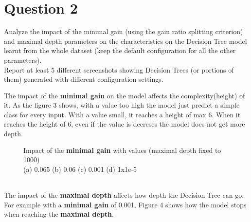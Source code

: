 \section{Question 2}

\begin{question}
    Analyze the impact of the minimal gain (using the gain ratio splitting criterion) and maximal depth
    parameters on the characteristics on the Decision Tree model learnt from the whole dataset (keep
    the default configuration for all the other parameters).
    \\
    Report at least 5 different screenshots showing Decision Trees (or portions of them) generated with
    different configuration settings.
\end{question}

\begin{answer}
    The impact of the \textbf{minimal gain} on the model affects the complexity(height) of it. As the figure 3 shows,
    with a value too high the model just predict a simple class for every input.
    With a value small, it reaches a height of max 6.
    When it reaches the height of 6, even if the value is decreses the model does not get more depth.
    \begin{figure}
        \centering
        \caption{Impact of the \textbf{minimal gain} with values (maximal depth fixed to 1000)
        \\
            (a) 0.065 (b) 0.06 (c) 0.001 (d) 1x1e-5}
    \end{figure}
    \linebreak
    \\
    The impact of the \textbf{maximal depth} affects how depth the Decision Tree can go. For example with a
    \textbf{minimal gain} of 0.001, Figure 4 shows how the model stops when reaching the \textbf{maximal depth}.
    \begin{figure}
        \centering

\end{figure}
\end{answer}
